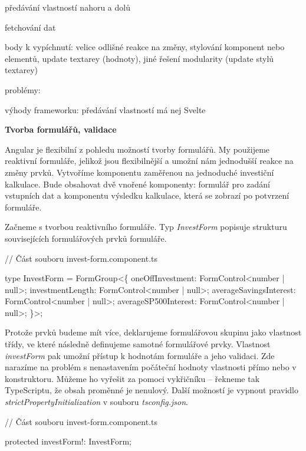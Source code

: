 \begin{citemize}
	\item předávání vlastností nahoru a dolů
	\item fetchování dat
	\item body k vypíchnutí: velice odlišné reakce na změny, stylování komponent nebo elementů, update textarey (hodnoty), jiné řešení modularity (update stylů textarey)
	\item problémy:
	\item výhody frameworku: předávání vlastností má nej Svelte
\end{citemize}

\begin{flushleft}
  \textbf{Tvorba formulářů, validace}
\end{flushleft}

Angular je flexibilní z pohledu možností tvorby formulářů. My použijeme reaktivní formuláře, jelikož jsou flexibilnější a umožní nám jednodušší reakce na změny prvků.
Vytvoříme komponentu zaměřenou na jednoduché investiční kalkulace. 
Bude obsahovat dvě vnořené komponenty: formulář pro zadání vstupních dat a komponentu výsledku kalkulace, která se zobrazí po potvrzení formuláře.

Začneme s tvorbou reaktivního formuláře. Typ \emph{InvestForm} popisuje strukturu souvisejících formulářových prvků formuláře.

\begin{prog}
// Část souboru invest-form.component.ts

type InvestForm = FormGroup<\{
  oneOffInvestment: FormControl<number | null>;
  investmentLength: FormControl<number | null>;
  averageSavingsInterest: FormControl<number | null>;
  averageSP500Interest: FormControl<number | null>;
\}>;
\end{prog}

Protože prvků budeme mít více, deklarujeme formulářovou skupinu jako vlastnost třídy, ve které následně definujeme samotné formulářové prvky. 
Vlastnost \emph{investForm} pak umožní přístup k hodnotám formuláře a jeho validaci. Zde narazíme na problém s nenastavením počáteční hodnoty vlastnosti přímo nebo v konstruktoru. 
Můžeme ho vyřešit za pomoci vykřičníku -- řekneme tak TypeScriptu, že obsah proměnné je nenulový. Další možností je vypnout pravidlo \emph{strictPropertyInitialization} v souboru \emph{tsconfig.json}.

\begin{prog}
// Část souboru invest-form.component.ts

protected investForm!: InvestForm;
\end{prog}

